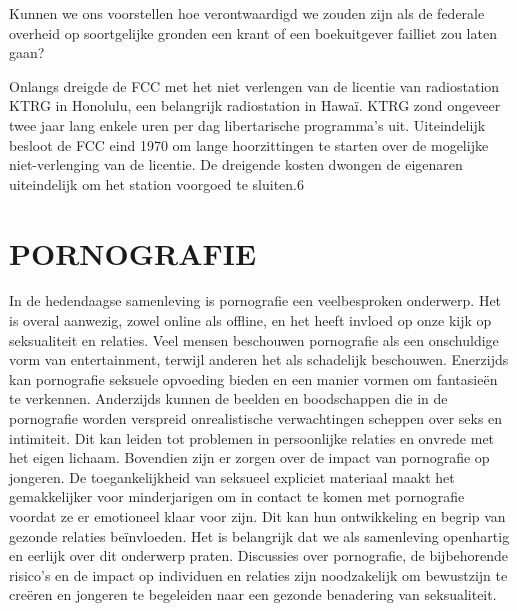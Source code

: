 \documentclass[
  a5paper,
  smalldemyvopaper,10pt,twoside,onecolumn,openright,extrafontsizes,hidelinks]{memoir}
\begin{document}
Kunnen we ons voorstellen hoe verontwaardigd we zouden zijn als de
federale overheid op soortgelijke gronden een krant of een boekuitgever
failliet zou laten gaan?

Onlangs dreigde de FCC met het niet verlengen van de licentie van
radiostation KTRG in Honolulu, een belangrijk radiostation in Hawaï.
KTRG zond ongeveer twee jaar lang enkele uren per dag libertarische
programma's uit. Uiteindelijk besloot de FCC eind 1970 om lange
hoorzittingen te starten over de mogelijke niet-verlenging van de
licentie. De dreigende kosten dwongen de eigenaren uiteindelijk om het
station voorgoed te sluiten.6

\section{PORNOGRAFIE}\label{pornografie}

In de hedendaagse samenleving is pornografie een veelbesproken
onderwerp. Het is overal aanwezig, zowel online als offline, en het
heeft invloed op onze kijk op seksualiteit en relaties. Veel mensen
beschouwen pornografie als een onschuldige vorm van entertainment,
terwijl anderen het als schadelijk beschouwen. Enerzijds kan pornografie
seksuele opvoeding bieden en een manier vormen om fantasieën te
verkennen. Anderzijds kunnen de beelden en boodschappen die in de
pornografie worden verspreid onrealistische verwachtingen scheppen over
seks en intimiteit. Dit kan leiden tot problemen in persoonlijke
relaties en onvrede met het eigen lichaam. Bovendien zijn er zorgen over
de impact van pornografie op jongeren. De toegankelijkheid van seksueel
expliciet materiaal maakt het gemakkelijker voor minderjarigen om in
contact te komen met pornografie voordat ze er emotioneel klaar voor
zijn. Dit kan hun ontwikkeling en begrip van gezonde relaties
beïnvloeden. Het is belangrijk dat we als samenleving openhartig en
eerlijk over dit onderwerp praten. Discussies over pornografie, de
bijbehorende risico's en de impact op individuen en relaties zijn
noodzakelijk om bewustzijn te creëren en jongeren te begeleiden naar een
gezonde benadering van seksualiteit.
\end{document}
